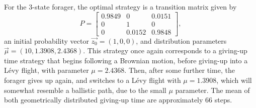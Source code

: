 For the $3$-state forager, the optimal strategy is a transition matrix given by
\begin{equation*}
P = \begin{bmatrix}
 0.9849  &  0 &   0.0151\\
0  &  1  &  0\\
0 &  0.0152   & 0.9848
\end{bmatrix},
\end{equation*}
an initial probability vector $\vec{z_{0}} = (1,0,0)$, and distribution parameters $\vec{\mu} = (10, 1.3908,    2.4368)$. This strategy once again corresponds to a giving-up time strategy that begins following a Brownian motion, before giving-up into a L\'{e}vy flight, with parameter $\mu = 2.4368$. Then, after some further time, the forager gives up again, and switches to a L\'{e}vy flight with $\mu = 1.3908$, which will somewhat resemble a ballistic path, due to the small $\mu$ parameter. The mean of both geometrically distributed giving-up time are approximately $66$ steps.
